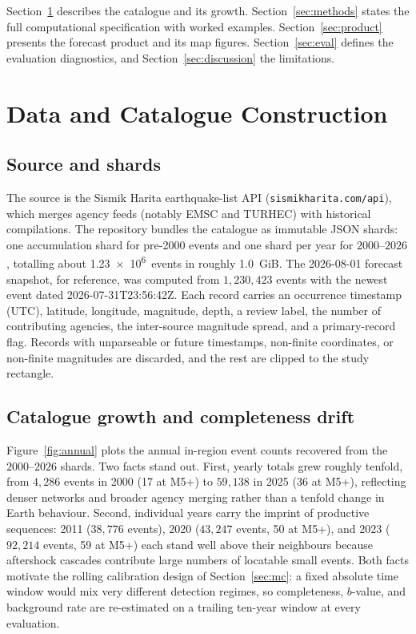 \documentclass[11pt,a4paper]{article}
\begin{document}
Section~\ref{sec:data} describes the catalogue and its growth.
Section~\ref{sec:methods} states the full computational specification with
worked examples. Section~\ref{sec:product} presents the forecast product and
its map figures. Section~\ref{sec:eval} defines the evaluation diagnostics,
and Section~\ref{sec:discussion} the limitations.

\section{Data and Catalogue Construction}\label{sec:data}

\subsection{Source and shards}
The source is the Sismik Harita earthquake-list API
(\texttt{sismikharita.com/api}), which merges agency feeds (notably EMSC and
TURHEC) with historical compilations. The repository bundles the catalogue as
immutable JSON shards: one accumulation shard for pre-2000 events and one
shard per year for $2000$--$2026$, totalling about \SI{1.23e6}{events} in
roughly \SI{1.0}{GiB}. The 2026-08-01 forecast snapshot, for reference, was
computed from $1{,}230{,}423$ events with the newest event dated
2026-07-31T23:56:42Z. Each record carries an occurrence timestamp (UTC),
latitude, longitude, magnitude, depth, a review label, the number of
contributing agencies, the inter-source magnitude spread, and a
primary-record flag. Records with unparseable or future timestamps,
non-finite coordinates, or non-finite magnitudes are discarded, and the rest
are clipped to the study rectangle.

\subsection{Catalogue growth and completeness drift}
Figure~\ref{fig:annual} plots the annual in-region event counts recovered
from the $2000$--$2026$ shards. Two facts stand out. First, yearly totals
grew roughly tenfold, from $4{,}286$ events in 2000 (17 at M5+) to $59{,}138$
in 2025 (36 at M5+), reflecting denser networks and broader agency merging
rather than a tenfold change in Earth behaviour. Second, individual years
carry the imprint of productive sequences: 2011 ($38{,}776$ events), 2020
($43{,}247$ events, 50 at M5+), and 2023 ($92{,}214$ events, 59 at M5+) each
stand well above their neighbours because aftershock cascades contribute
large numbers of locatable small events. Both facts motivate the rolling
calibration design of Section~\ref{sec:mc}: a fixed absolute time window
would mix very different detection regimes, so completeness, $b$-value, and
background rate are re-estimated on a trailing ten-year window at every
evaluation.
\end{document}
